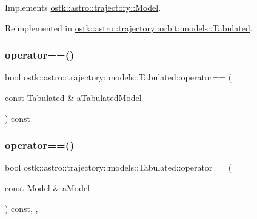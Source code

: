 Implements \hyperlink{classostk_1_1astro_1_1trajectory_1_1_model_a2dd77b9f6939d738f3a489f26c955340}{ostk\+::astro\+::trajectory\+::\+Model}.



Reimplemented in \hyperlink{classostk_1_1astro_1_1trajectory_1_1orbit_1_1models_1_1_tabulated_a17610dc24fefecd03ae595cc78ef3079}{ostk\+::astro\+::trajectory\+::orbit\+::models\+::\+Tabulated}.

\mbox{\label{classostk_1_1astro_1_1trajectory_1_1models_1_1_tabulated_aec2a2014af9276d9cc89cd1898a5d001}} 
\subsubsection{\texorpdfstring{operator==()}{operator==()}\hspace{0.1cm}{\footnotesize\ttfamily [1/2]}}
{\footnotesize\ttfamily bool ostk\+::astro\+::trajectory\+::models\+::\+Tabulated\+::operator== (\begin{DoxyParamCaption}\item[{const \hyperlink{classostk_1_1astro_1_1trajectory_1_1models_1_1_tabulated}{Tabulated} \&}]{a\+Tabulated\+Model }\end{DoxyParamCaption}) const}

\mbox{\label{classostk_1_1astro_1_1trajectory_1_1models_1_1_tabulated_a9d206aee35ebabe4b36ddfc057142f16}} 
\subsubsection{\texorpdfstring{operator==()}{operator==()}\hspace{0.1cm}{\footnotesize\ttfamily [2/2]}}
{\footnotesize\ttfamily bool ostk\+::astro\+::trajectory\+::models\+::\+Tabulated\+::operator== (\begin{DoxyParamCaption}\item[{const \hyperlink{classostk_1_1astro_1_1trajectory_1_1_model}{Model} \&}]{a\+Model }\end{DoxyParamCaption}) const\hspace{0.3cm}{\ttfamily [override]}, {\ttfamily [protected]}, {\ttfamily [virtual]}}



